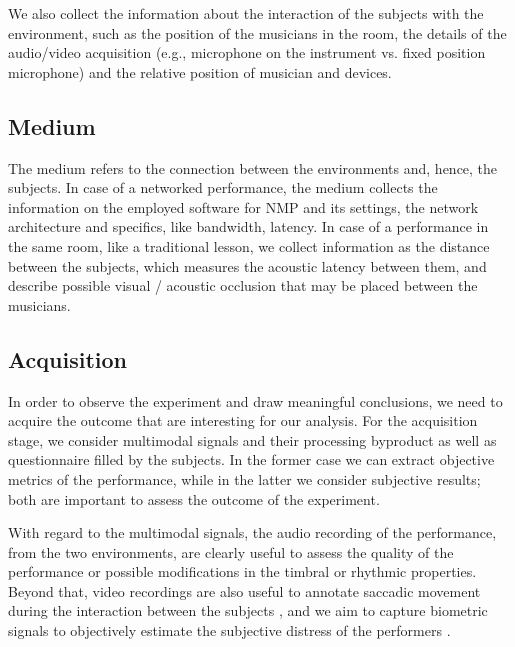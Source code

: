 We also collect the information about the interaction of the subjects with the environment, such as the position of the musicians in the room, the details of the audio/video acquisition (e.g., microphone on the instrument vs. fixed position microphone) and the relative position of musician and devices. 

\subsection{Medium}
The medium refers to the connection between the environments and, hence, the subjects. In case of a networked performance, the medium collects the information on the employed software for NMP and its settings, the network architecture and specifics, like bandwidth, latency. In case of a performance in the same room, like a traditional lesson, we collect information as the distance between the subjects, which measures the acoustic latency between them, and describe possible visual / acoustic occlusion that may be placed between the musicians. 

\subsection{Acquisition}
In order to observe the experiment and draw meaningful conclusions, we need to acquire the outcome that are interesting for our analysis. For the acquisition stage, we consider multimodal signals and their processing byproduct as well as questionnaire filled by the subjects. In the former case we can extract objective metrics of the performance, while in the latter we consider subjective results; both are important to assess the outcome of the experiment. 

With regard to the multimodal signals, the audio recording of the performance, from the two environments, are clearly useful to assess the quality of the performance or possible modifications in the timbral or rhythmic properties. Beyond that, video recordings are also useful to annotate saccadic movement during the interaction between the subjects \cite{vandemoortele2018gazing}, and we aim to capture biometric signals to objectively estimate the subjective distress of the performers \cite{Yoshie2009}. 
